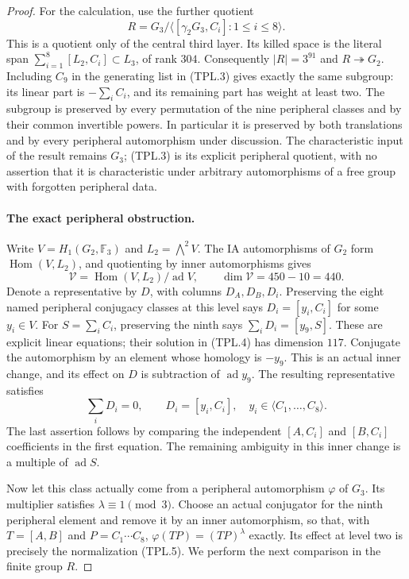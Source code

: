 \begin{proof}
For the calculation, use the further quotient
\[
 R=G_3/\langle[\gamma_2G_3,C_i]:1\leq i\leq8\rangle.
                                                        \tag{TPL.3}
\]
This is a quotient only of the central third layer.  Its killed
space is the literal span
$\sum_{i=1}^8[L_2,C_i]\subset L_3$, of rank $304$.
Consequently $|R|=3^{91}$ and $R\twoheadrightarrow G_2$.
Including $C_9$ in the generating list in (TPL.3) gives exactly
the same subgroup: its linear part is $-\sum_i C_i$, and its
remaining part has weight at least two.  The subgroup is
preserved by every permutation of the nine peripheral classes
and by their common invertible powers.  In particular it is
preserved by both translations and by every peripheral
automorphism under discussion.  The characteristic input of
the result remains $G_3$; (TPL.3) is its explicit peripheral
quotient, with no assertion that it is characteristic under
arbitrary automorphisms of a free group with forgotten
peripheral data.

\paragraph{The exact peripheral obstruction.}
Write $V=H_1(G_2,\mathbb F_3)$ and
$L_2=\bigwedge^2 V$.  The IA automorphisms of $G_2$ form
$\operatorname{Hom}(V,L_2)$, and quotienting by inner
automorphisms gives
\[
 \mathcal V=\operatorname{Hom}(V,L_2)/\operatorname{ad}V,
 \qquad \dim\mathcal V=450-10=440.                    \tag{TPL.4}
\]
Denote a representative by $D$, with columns $D_A,D_B,D_i$.
Preserving the eight named peripheral conjugacy classes at this
level says $D_i=[y_i,C_i]$ for some $y_i\in V$.
For $S=\sum_iC_i$, preserving the ninth says
$\sum_iD_i=[y_9,S]$.  These are explicit linear equations;
their solution in (TPL.4) has dimension $117$.
Conjugate the automorphism by an element whose homology is
$-y_9$.  This is an actual inner change, and its effect on
$D$ is subtraction of $\operatorname{ad}y_9$.  The resulting
representative satisfies
\[
 \sum_iD_i=0,
 \qquad D_i=[y_i,C_i],\quad
 y_i\in\langle C_1,\ldots,C_8\rangle.                 \tag{TPL.5}
\]
The last assertion follows by comparing the independent
$[A,C_i]$ and $[B,C_i]$ coefficients in the first equation.
The remaining ambiguity in this inner change is a multiple of
$\operatorname{ad}S$.

Now let this class actually come from a peripheral automorphism
$\varphi$ of $G_3$.  Its multiplier satisfies
$\lambda\equiv1\pmod3$.  Choose an actual conjugator for the
ninth peripheral element and remove it by an inner automorphism,
so that, with $T=[A,B]$ and $P=C_1\cdots C_8$,
$\varphi(TP)=(TP)^\lambda$ exactly.  Its effect at level two
is precisely the normalization (TPL.5).
We perform the next comparison in the finite group $R$.


\end{proof}
